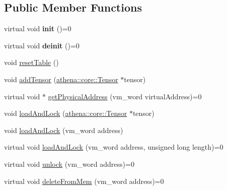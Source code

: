 \subsection*{Public Member Functions}
\begin{DoxyCompactItemize}
\item 
\mbox{\label{classathena_1_1backend_1_1_abstract_memory_manager_aecbd824ce1897bc4fabd0280ed11e659}} 
virtual void {\bfseries init} ()=0
\item 
\mbox{\label{classathena_1_1backend_1_1_abstract_memory_manager_aec0839b1b9bca9c59ea4caed4973888e}} 
virtual void {\bfseries deinit} ()=0
\item 
void \mbox{\hyperlink{classathena_1_1backend_1_1_abstract_memory_manager_a358f614d4358f5dce28f17dba6917b1f}{reset\+Table}} ()
\item 
void \mbox{\hyperlink{classathena_1_1backend_1_1_abstract_memory_manager_adaa80b617f6f3f19ba5b1ddd2b0377e7}{add\+Tensor}} (\mbox{\hyperlink{classathena_1_1core_1_1_tensor}{athena\+::core\+::\+Tensor}} $\ast$tensor)
\item 
virtual void $\ast$ \mbox{\hyperlink{classathena_1_1backend_1_1_abstract_memory_manager_ad441d7a2281f5f2b2627272d136f72b8}{get\+Physical\+Address}} (vm\+\_\+word virtual\+Address)=0
\item 
void \mbox{\hyperlink{classathena_1_1backend_1_1_abstract_memory_manager_a2bbfba2a5104aab3068d46214a6ae7df}{load\+And\+Lock}} (\mbox{\hyperlink{classathena_1_1core_1_1_tensor}{athena\+::core\+::\+Tensor}} $\ast$tensor)
\item 
void \mbox{\hyperlink{classathena_1_1backend_1_1_abstract_memory_manager_a47ea5a77f81f91f803f748720c5c19b5}{load\+And\+Lock}} (vm\+\_\+word address)
\item 
virtual void \mbox{\hyperlink{classathena_1_1backend_1_1_abstract_memory_manager_a9fe52e4020802d6f526fba06adce8407}{load\+And\+Lock}} (vm\+\_\+word address, unsigned long length)=0
\item 
virtual void \mbox{\hyperlink{classathena_1_1backend_1_1_abstract_memory_manager_aec859ee3bf6011d8710b2ec4bfc2373e}{unlock}} (vm\+\_\+word address)=0
\item 
virtual void \mbox{\hyperlink{classathena_1_1backend_1_1_abstract_memory_manager_a8ffd6cf21559978f394e2e11815506b5}{delete\+From\+Mem}} (vm\+\_\+word address)=0
\item 

\end{DoxyCompactItemize}
